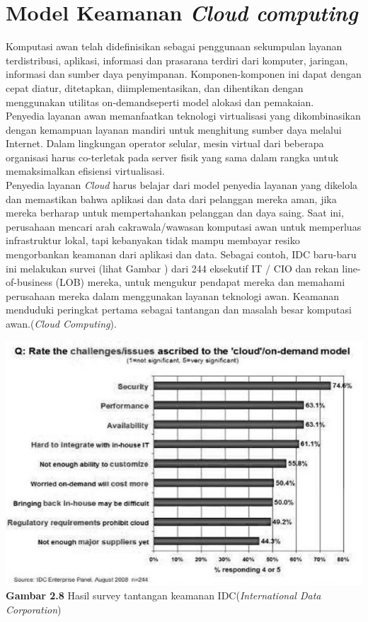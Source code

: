\section{Model  Keamanan \textit{Cloud computing}}
Komputasi awan telah didefinisikan sebagai penggunaan sekumpulan layanan terdistribusi, aplikasi, informasi dan prasarana terdiri dari komputer, jaringan, informasi dan sumber daya penyimpanan. Komponen-komponen ini dapat dengan cepat diatur,  ditetapkan, diimplementasikan, dan dihentikan dengan menggunakan utilitas  on-demandseperti  model alokasi  dan pemakaian.\\
\tab Penyedia layanan awan memanfaatkan teknologi virtualisasi  yang dikombinasikan dengan kemampuan layanan mandiri untuk menghitung sumber daya melalui Internet. Dalam lingkungan operator selular, mesin virtual dari beberapa organisasi  harus  co-terletak  pada server fisik yang sama dalam rangka untuk memaksimalkan efisiensi  virtualisasi.\\
Penyedia layanan \textit{Cloud} harus belajar dari model penyedia layanan yang dikelola dan memastikan bahwa aplikasi dan data dari pelanggan mereka  aman,  jika mereka  berharap  untuk   mempertahankan   pelanggan   dan   daya   saing.   Saat   ini,   perusahaan   mencari arah cakrawala/wawasan komputasi awan untuk memperluas infrastruktur lokal, tapi kebanyakan  tidak mampu membayar resiko mengorbankan keamanan dari aplikasi  dan  data.  Sebagai contoh, IDC baru-baru ini melakukan survei (lihat Gambar ) dari 244 eksekutif  IT / CIO dan rekan line-of-business (LOB) mereka, untuk mengukur pendapat mereka dan memahami perusahaan mereka dalam menggunakan layanan teknologi awan. Keamanan menduduki peringkat  pertama sebagai tantangan dan masalah besar komputasi awan.(\textit{Cloud  Computing}).\\
\begin{center}
\includegraphics[scale=1]{gambar28.jpg} \\
\textbf{Gambar  2.8} Hasil survey tantangan keamanan IDC(\textit{International Data Corporation})
\end{center}

